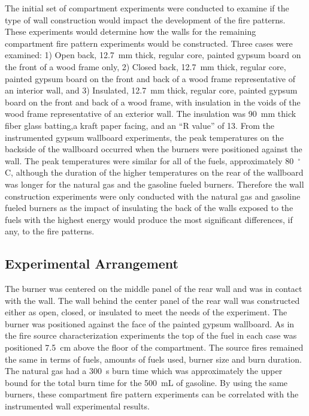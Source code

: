 \documentclass[twoside]{uocthesis}
\begin{document}
 The initial set of compartment experiments were conducted to examine if the type of wall construction would impact the development of the fire patterns. These experiments would determine how the walls for the remaining compartment fire pattern experiments would be constructed.  Three cases were examined: 1) Open back, 12.7~mm thick, regular core, painted gypsum board on the front of a wood frame only, 2) Closed back, 12.7~mm thick, regular core, painted gypsum board on the front and back of a wood frame representative of an interior wall, and 3) Insulated, 12.7~mm thick, regular core, painted gypsum board on the front and back of a wood frame, with insulation in the voids of the wood frame representative of an exterior wall. The insulation was 90~mm thick fiber glass batting,a kraft paper facing, and an ``R value'' of 13.  From the instrumented gypsum wallboard experiments, the peak temperatures on the backside of the wallboard occurred when the burners were positioned against the wall.  The peak temperatures were similar for all of the fuels, approximately 80~$^\circ$C, although the duration of the higher temperatures on the rear of the wallboard was longer for the natural gas and the gasoline fueled burners. Therefore the wall construction experiments were only conducted with the natural gas and gasoline fueled burners as the impact of insulating the back of the walls exposed to the fuels with the highest energy would produce the most significant differences, if any, to the fire patterns.


\subsection{Experimental Arrangement}

The burner was centered on the middle panel of the rear wall and was in contact with the wall. The wall behind the center panel of the rear wall was constructed either as open, closed, or insulated to meet the needs of the experiment. The burner was positioned against the face of the painted gypsum wallboard. As in the fire source characterization experiments the top of the fuel in each case was positioned 7.5~cm above the floor of the compartment. The source fires remained the same in terms of fuels, amounts of fuels used, burner size and burn duration.  The natural gas had a 300~s burn time which was approximately the upper bound for the total burn time for the 500~mL of gasoline.  By using the same burners, these compartment fire pattern experiments can be correlated with the instrumented wall experimental results.
\end{document}
